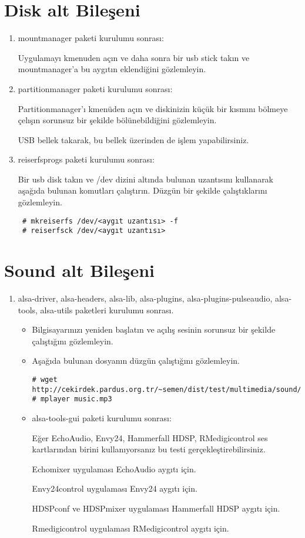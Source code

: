 \documentclass[a4paper,10pt]{article}
\begin{document}
\section{Disk alt Bileşeni}
\begin{enumerate}
 \item mountmanager paketi kurulumu sonrası:

Uygulamayı kmenuden açın ve daha sonra bir usb stick takın ve mountmanager'a bu aygıtın eklendiğini gözlemleyin.
 \item partitionmanager paketi kurulumu sonrası:

Partitionmanager'ı kmenüden açın ve diskinizin küçük bir kısmını bölmeye çelışın sorunsuz bir şekilde bölünebildiğini gözlemleyin.

USB bellek takarak, bu bellek üzerinden de işlem yapabilirsiniz.

\item reiserfsprogs paketi kurulumu sonrası:

Bir usb disk takın ve /dev dizini altında bulunan uzantısını kullanarak aşağıda bulunan komutları çalıştırın. Düzgün bir şekilde çalıştıklarını gözlemleyin. 

\begin{verbatim}
 # mkreiserfs /dev/<aygıt uzantısı> -f
 # reiserfsck /dev/<aygıt uzantısı>
\end{verbatim}

\end{enumerate}
\section{Sound alt Bileşeni}
\begin{enumerate}
 \item alsa-driver, alsa-headers, alsa-lib, alsa-plugins, alsa-plugins-pulseaudio, alsa-tools, alsa-utils paketleri kurulumu sonrası.
\begin{itemize}
 \item Bilgisayarınızı yeniden başlatın ve açılış sesinin sorunsuz bir şekilde çalıştığını gözlemleyin.
 \item Aşağıda bulunan dosyanın düzgün çalıştığını gözlemleyin.
\begin{verbatim}
# wget http://cekirdek.pardus.org.tr/~semen/dist/test/multimedia/sound/sound/music.mp3
# mplayer music.mp3
\end{verbatim}

\item alsa-tools-gui paketi kurulumu sonrası:

Eğer  EchoAudio, Envy24, Hammerfall HDSP, RMedigicontrol ses kartlarından birini kullanıyorsanız bu testi gerçekleştirebilirsiniz.

Echomixer uygulaması EchoAudio aygıtı için.

Envy24control uygulaması Envy24 aygıtı için.

HDSPconf ve HDSPmixer uygulaması Hammerfall HDSP aygıtı için.

Rmedigicontrol uygulaması RMedigicontrol aygıtı için.
\end{itemize}


\end{enumerate}
\end{document}
